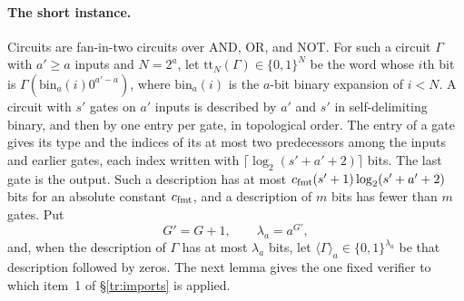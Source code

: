 \documentclass[11pt,letterpaper]{article}
\theoremstyle{definition}
\theoremstyle{remark}
\begin{document}
\paragraph{The short instance.}
Circuits are fan-in-two circuits over AND, OR, and NOT. For such a
circuit $\Gamma$ with $a'\ge a$ inputs and $N=2^a$, let
$\mathrm{tt}_N(\Gamma)\in\{0,1\}^N$ be the word whose $i$th bit is
$\Gamma(\mathrm{bin}_a(i)0^{a'-a})$, where $\mathrm{bin}_a(i)$ is the
$a$-bit binary expansion of $i<N$. A circuit with $s'$ gates on $a'$
inputs is described by $a'$ and $s'$ in self-delimiting binary, and then
by one entry per gate, in topological order. The entry of a gate gives
its type and the indices of its at most two predecessors among the
inputs and earlier gates, each index written with
$\lceil\log_2(s'+a'+2)\rceil$ bits. The last gate is the output. Such a
description has at most $c_{\rm fmt}(s'+1)\log_2(s'+a'+2)$
bits for an absolute constant $c_{\rm fmt}$, and a description of $m$
bits has fewer than $m$ gates. Put
\[
 G'=G+1,\qquad \lambda_a=a^{G'},
\]
and, when the description of $\Gamma$ has at most $\lambda_a$ bits, let
$\langle\Gamma\rangle_a\in\{0,1\}^{\lambda_a}$ be that description
followed by zeros. The next lemma gives the one fixed verifier to which
item~1 of \S\ref{tr:imports} is applied.
\end{document}
